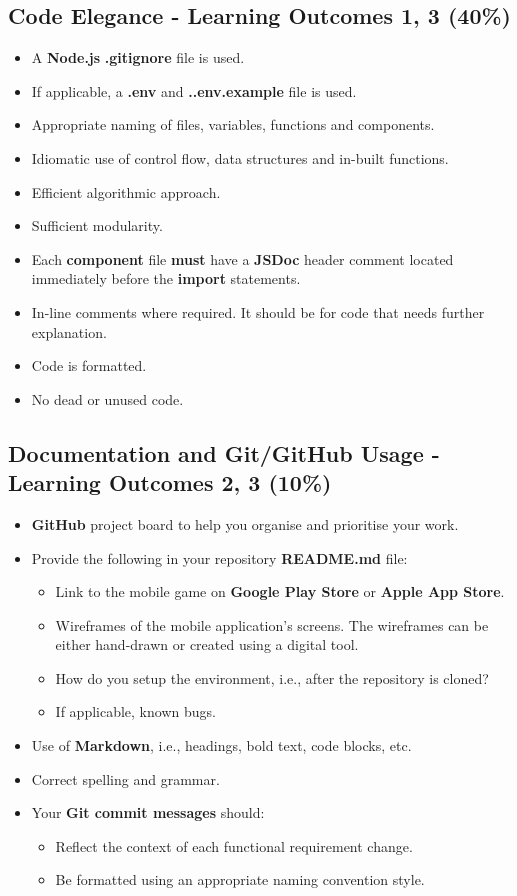 \documentclass{article}
\begin{document}
\subsection*{Code Elegance - Learning Outcomes 1, 3 (40\%)}
\begin{itemize}
	\item A \textbf{Node.js} \textbf{.gitignore} file is used.
	\item If applicable, a \textbf{.env} and \textbf{..env.example} file is used.
  \item Appropriate naming of files, variables, functions and components.
	\item Idiomatic use of control flow, data structures and in-built functions.
  \item Efficient algorithmic approach.
  \item Sufficient modularity.
  \item Each \textbf{component} file \textbf{must} have a \textbf{JSDoc} header comment located immediately before the \textbf{import} statements.
	\item In-line comments where required. It should be for code that needs further explanation.
  \item Code is formatted.
\item No dead or unused code. 
\end{itemize}

\subsection*{Documentation and Git/GitHub Usage - Learning Outcomes 2, 3 (10\%)}
\begin{itemize}
	\item \textbf{GitHub} project board to help you organise and prioritise your work. 
    \item Provide the following in your repository \textbf{README.md} file:
    \begin{itemize} 
	  \item Link to the mobile game on \textbf{Google Play Store} or \textbf{Apple App Store}.
      \item Wireframes of the mobile application's screens. The wireframes can be either hand-drawn or created using a digital tool.
	  \item How do you setup the environment, i.e., after the repository is cloned?
      \item If applicable, known bugs.
    \end{itemize}
    \item Use of \textbf{Markdown}, i.e., headings, bold text, code blocks, etc.
    \item Correct spelling and grammar.
    \item Your \textbf{Git commit messages} should:
    \begin{itemize}
      \item Reflect the context of each functional requirement change.
      \item Be formatted using an appropriate naming convention style.
    \end{itemize}
\end{itemize}
\end{document}
